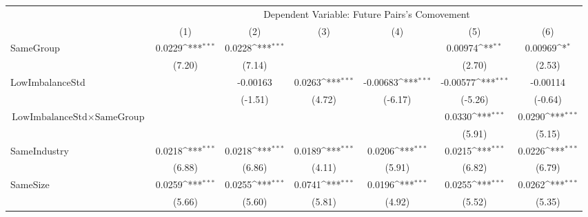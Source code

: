 {
\def\sym#1{\ifmmode^{#1}\else\(^{#1}\)\fi}
\begin{tabular}{l*{6}{c}}
\hline\hline
                    &\multicolumn{6}{c}{Dependent Variable:  Future Pairs's Comovement}                                                                 \\\cmidrule(lr){2-7}
                    &\multicolumn{1}{c}{(1)}         &\multicolumn{1}{c}{(2)}         &\multicolumn{1}{c}{(3)}         &\multicolumn{1}{c}{(4)}         &\multicolumn{1}{c}{(5)}         &\multicolumn{1}{c}{(6)}         \\
\hline
SameGroup           &      0.0229\sym{***}&      0.0228\sym{***}&                     &                     &     0.00974\sym{**} &     0.00969\sym{*}  \\
                    &      (7.20)         &      (7.14)         &                     &                     &      (2.70)         &      (2.53)         \\
[1em]
LowImbalanceStd     &                     &    -0.00163         &      0.0263\sym{***}&    -0.00683\sym{***}&    -0.00577\sym{***}&    -0.00114         \\
                    &                     &     (-1.51)         &      (4.72)         &     (-6.17)         &     (-5.26)         &     (-0.64)         \\
[1em]
 $ \text{LowImbalanceStd} \times {\text{SameGroup} } $ &                     &                     &                     &                     &      0.0330\sym{***}&      0.0290\sym{***}\\
                    &                     &                     &                     &                     &      (5.91)         &      (5.15)         \\
[1em]
SameIndustry        &      0.0218\sym{***}&      0.0218\sym{***}&      0.0189\sym{***}&      0.0206\sym{***}&      0.0215\sym{***}&      0.0226\sym{***}\\
                    &      (6.88)         &      (6.86)         &      (4.11)         &      (5.91)         &      (6.82)         &      (6.79)         \\
[1em]
SameSize            &      0.0259\sym{***}&      0.0255\sym{***}&      0.0741\sym{***}&      0.0196\sym{***}&      0.0255\sym{***}&      0.0262\sym{***}\\
                    &      (5.66)         &      (5.60)         &      (5.81)         &      (4.92)         &      (5.52)         &      (5.35)         \\

\end{tabular}}
